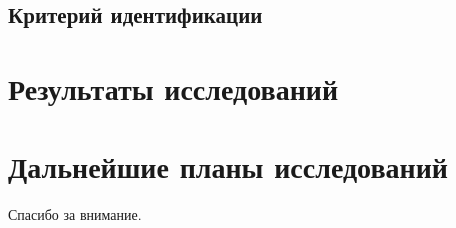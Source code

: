 \documentclass{beamer}
\begin{document}
\subsection{Критерий идентификации}

\section{Результаты исследований}

\section{Дальнейшие планы исследований}

\begin{frame}
\begin{center}
  \LARGE{Спасибо за внимание.}
\end{center}
\end{frame}

\frame{\titlepage}
\end{document}
